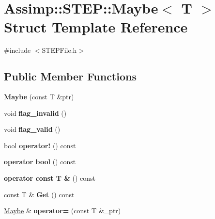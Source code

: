 \hypertarget{struct_assimp_1_1_s_t_e_p_1_1_maybe}{\section{Assimp\+:\+:S\+T\+E\+P\+:\+:Maybe$<$ T $>$ Struct Template Reference}
\label{struct_assimp_1_1_s_t_e_p_1_1_maybe}
}


{\ttfamily \#include $<$S\+T\+E\+P\+File.\+h$>$}

\subsection*{Public Member Functions}
\begin{DoxyCompactItemize}
\item 
\hypertarget{struct_assimp_1_1_s_t_e_p_1_1_maybe_a47b619dc352fb83e3a078681c870cda4}{{\bfseries Maybe} (const T \&ptr)}\label{struct_assimp_1_1_s_t_e_p_1_1_maybe_a47b619dc352fb83e3a078681c870cda4}

\item 
\hypertarget{struct_assimp_1_1_s_t_e_p_1_1_maybe_ae512efb18739637f51d839aad61c5521}{void {\bfseries flag\+\_\+invalid} ()}\label{struct_assimp_1_1_s_t_e_p_1_1_maybe_ae512efb18739637f51d839aad61c5521}

\item 
\hypertarget{struct_assimp_1_1_s_t_e_p_1_1_maybe_a7b6f69f755cd2f194b9be5f9f11cc52c}{void {\bfseries flag\+\_\+valid} ()}\label{struct_assimp_1_1_s_t_e_p_1_1_maybe_a7b6f69f755cd2f194b9be5f9f11cc52c}

\item 
\hypertarget{struct_assimp_1_1_s_t_e_p_1_1_maybe_afdeb4c1c4f22997ce06a8fd97d4405cf}{bool {\bfseries operator!} () const }\label{struct_assimp_1_1_s_t_e_p_1_1_maybe_afdeb4c1c4f22997ce06a8fd97d4405cf}

\item 
\hypertarget{struct_assimp_1_1_s_t_e_p_1_1_maybe_a7df5d51d3f4400164d96d716a4c2cb54}{{\bfseries operator bool} () const }\label{struct_assimp_1_1_s_t_e_p_1_1_maybe_a7df5d51d3f4400164d96d716a4c2cb54}

\item 
\hypertarget{struct_assimp_1_1_s_t_e_p_1_1_maybe_a2665e2d7a8f47417ce47488723ef6f12}{{\bfseries operator const T \&} () const }\label{struct_assimp_1_1_s_t_e_p_1_1_maybe_a2665e2d7a8f47417ce47488723ef6f12}

\item 
\hypertarget{struct_assimp_1_1_s_t_e_p_1_1_maybe_a1649b44e679a30d9b0c3f3a84bd386fd}{const T \& {\bfseries Get} () const }\label{struct_assimp_1_1_s_t_e_p_1_1_maybe_a1649b44e679a30d9b0c3f3a84bd386fd}

\item 
\hypertarget{struct_assimp_1_1_s_t_e_p_1_1_maybe_ad26d98eaa244a8520c0f5a1e0dced4f3}{\hyperlink{struct_assimp_1_1_s_t_e_p_1_1_maybe}{Maybe} \& {\bfseries operator=} (const T \&\+\_\+ptr)}\label{struct_assimp_1_1_s_t_e_p_1_1_maybe_ad26d98eaa244a8520c0f5a1e0dced4f3}

\end{DoxyCompactItemize}
